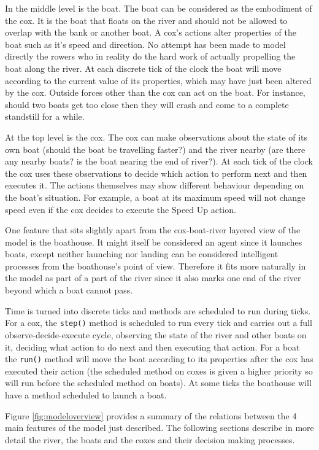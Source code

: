     In the middle level is the boat. The boat can be considered as the embodiment of the cox. It is the boat that floats on the river and should not be allowed to overlap with the bank or another boat. A cox's actions alter properties of the boat such as it's speed and direction. No attempt has been made to model directly the rowers who in reality do the hard work of actually propelling the boat along the river. At each discrete tick of the clock the boat will move according to the current value of its properties, which may have just been altered by the cox. Outside forces other than the cox can act on the boat. For instance, should two boats get too close then they will crash and come to a complete standstill for a while.
    
    At the top level is the cox. The cox can make observations about the state of its own boat (should the boat be travelling faster?) and the river nearby (are there any nearby boats? is the boat nearing the end of river?). At each tick of the clock the cox uses these observations to decide which action to perform next and then executes it. The actions themselves may show different behaviour depending on the boat's situation. For example, a boat at its maximum speed will not change speed even if the cox decides to execute the Speed Up action.
    
    One feature that sits slightly apart from the cox-boat-river layered view of the model is the boathouse. It might itself be considered an agent since it launches boats, except neither launching nor landing can be considered intelligent processes from the boathouse's point of view. Therefore it fits more naturally in the model as part of a part of the river since it also marks one end of the river beyond which a boat cannot pass.
    
    Time is turned into discrete ticks and methods are scheduled to run during ticks. For a cox, the \texttt{step()} method is scheduled to run every tick and carries out a full observe-decide-execute cycle, observing the state of the river and other boats on it, deciding what action to do next and then executing that action. For a boat the \texttt{run()} method will move the boat according to its properties after the cox has executed their action (the scheduled method on coxes is given a higher priority so will run before the scheduled method on boats). At some ticks the boathouse will have a method scheduled to launch a boat.
    
    Figure \ref{fig:modeloverview} provides a summary of the relations between the 4 main features of the model just described. The following sections describe in more detail the river, the boats and the coxes and their decision making processes.
    
